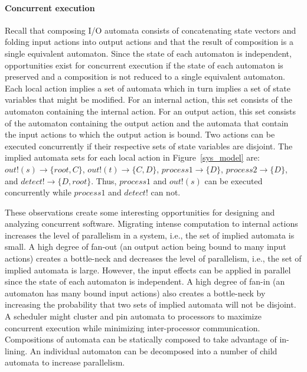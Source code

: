 \paragraph*{Concurrent execution}
Recall that composing I/O automata consists of concatenating state vectors and folding input actions into output actions and that the result of composition is a single equivalent automaton.
Since the state of each automaton is independent, opportunities exist for concurrent execution if the state of each automaton is preserved and a composition is not reduced to a single equivalent automaton.
Each local action implies a set of automata which in turn implies a set of state variables that might be modified.
For an internal action, this set consists of the automaton containing the internal action.
For an output action, this set consists of the automaton containing the output action and the automata that contain the input actions to which the output action is bound.
Two actions can be executed concurrently if their respective sets of state variables are disjoint.
The implied automata sets for each local action in Figure~\ref{sys_model} are: $out!(s) \to \{root, C\}$, $out!(t) \to \{C, D\}$, $process1 \to \{D\}$, $process2 \to \{D\}$, and $detect! \to \{D, root\}$.
Thus, $process1$ and $out!(s)$ can be executed concurrently while $process1$ and $detect!$ can not.

\ifjournal
These observations create some interesting opportunities for designing and analyzing concurrent software.
Migrating intense computation to internal actions increases the level of parallelism in a system, i.e., the set of implied automata is small.
A high degree of fan-out (an output action being bound to many input actions) creates a bottle-neck and decreases the level of parallelism, i.e., the set of implied automata is large.
However, the input effects can be applied in parallel since the state of each automaton is independent.
A high degree of fan-in (an automaton has many bound input actions) also creates a bottle-neck by increasing the probability that two sets of implied automata will not be disjoint.
A scheduler might cluster and pin automata to processors to maximize concurrent execution while minimizing inter-processor communication.
Compositions of automata can be statically composed to take advantage of in-lining.
An individual automaton can be decomposed into a number of child automata to increase parallelism.

